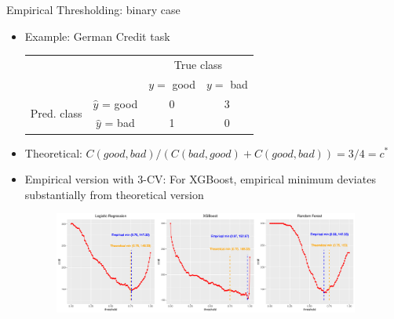 \documentclass[11pt,compress,t,notes=noshow, xcolor=table]{beamer}
\begin{document}
\begin{frame}{Empirical Thresholding: binary case}
    \begin{itemize}
        \item Example: German Credit task
        \footnotesize{
        \begin{center}
                            \begin{tabular}{cc|cc}
        			& &\multicolumn{2}{c}{True class} \\
        			& & $y=$ good & $y=$ bad  \\
        			\hline
        			\multirow{2}{*}{\parbox{0.3cm}{Pred.  class}} & $\hat y$ = good & 0 & 3 \\
        			& $\hat y$ = bad & 1 & 0\\
                \end{tabular}
        \end{center}
        }
        \item Theoretical: $C(good,bad)/(C(bad,good)+C(good,bad))=3/4=c^{*}$ 

        \item Empirical version with 3-CV: For XGBoost, empirical minimum deviates substantially from theoretical version

                \begin{figure}[h]
            \centering
            \includegraphics[width=0.95\textwidth]{figure_man/threshold_plots.pdf}
        \end{figure}

    \end{itemize}
\end{frame}
\end{document}
